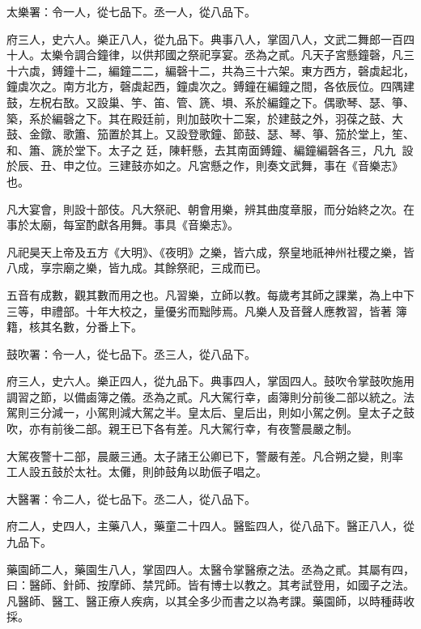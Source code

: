 \begin{pinyinscope}
 太樂署：令一人，從七品下。丞一人，從八品下。



 府三人，史六人。樂正八人，從九品下。典事八人，掌固八人，文武二舞郎一百四十人。太樂令調合鐘律，以供邦國之祭祀享宴。丞為之貳。凡天子宮懸鐘磬，凡三十六虡，鎛鐘十二，編鐘二二，編磬十二，共為三十六架。東方西方，磬虡起北，鐘虡次之。南方北方，磬虡起西，鐘虡次之。鎛鐘在編鐘之間，各依辰位。四隅建鼓，左柷右敔。又設巢、竽、笛、管、篪、塤、系於編鐘之下。偶歌琴、瑟、箏、築，系於編磬之下。其在殿廷前，則加鼓吹十二案，於建鼓之外，羽葆之鼓、大鼓、金鐓、歌簫、笳置於其上。又設登歌鐘、節鼓、瑟、琴、箏、笳於堂上，笙、和、簫、篪於堂下。太子之
 廷，陳軒懸，去其南面鎛鐘、編鐘編磬各三，凡九，設於辰、丑、申之位。三建鼓亦如之。凡宮懸之作，則奏文武舞，事在《音樂志》也。



 凡大宴會，則設十部伎。凡大祭祀、朝會用樂，辨其曲度章服，而分始終之次。在事於太廟，每室酌獻各用舞。事具《音樂志》。



 凡祀昊天上帝及五方《大明》、《夜明》之樂，皆六成，祭皇地祇神州社稷之樂，皆八成，享宗廟之樂，皆九成。其餘祭祀，三成而已。



 五音有成數，觀其數而用之也。凡習樂，立師以教。每歲考其師之課業，為上中下三等，申禮部。十年大校之，量優劣而黜陟焉。凡樂人及音聲人應教習，皆著
 簿籍，核其名數，分番上下。



 鼓吹署：令一人，從七品下。丞三人，從八品下。



 府三人，史六人。樂正四人，從九品下。典事四人，掌固四人。鼓吹令掌鼓吹施用調習之節，以備鹵簿之儀。丞為之貳。凡大駕行幸，鹵簿則分前後二部以統之。法駕則三分減一，小駕則減大駕之半。皇太后、皇后出，則如小駕之例。皇太子之鼓吹，亦有前後二部。親王已下各有差。凡大駕行幸，有夜警晨嚴之制。



 大駕夜警十二部，晨嚴三通。太子諸王公卿已下，警嚴有差。凡合朔之變，則率
 工人設五鼓於太社。太儺，則帥鼓角以助侲子唱之。



 大醫署：令二人，從七品下。丞二人，從八品下。



 府二人，史四人，主藥八人，藥童二十四人。醫監四人，從八品下。醫正八人，從九品下。



 藥園師二人，藥園生八人，掌固四人。太醫令掌醫療之法。丞為之貳。其屬有四，曰：醫師、針師、按摩師、禁咒師。皆有博士以教之。其考試登用，如國子之法。凡醫師、醫工、醫正療人疾病，以其全多少而書之以為考課。藥園師，以時種蒔收採。




\end{pinyinscope}
